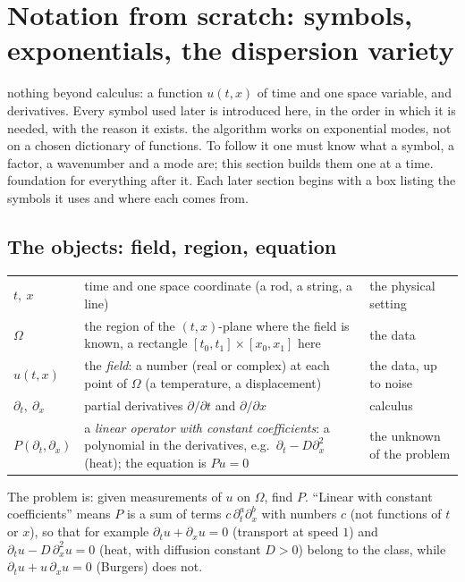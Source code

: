 \section{Notation from scratch: symbols, exponentials, the dispersion variety}\label{sec:prelim}
\sectionbrief
{nothing beyond calculus: a function $u(t,x)$ of time and one space variable, and derivatives. Every symbol used later is introduced here, in the order in which it is needed, with the reason it exists.}
{the algorithm works on exponential modes, not on a chosen dictionary of functions. To follow it one must know what a symbol, a factor, a wavenumber and a mode are; this section builds them one at a time.}
{foundation for everything after it. Each later section begins with a box listing the symbols it uses and where each comes from.}

\subsection{The objects: field, region, equation}
\begin{symbols}
\begin{tabular}{@{}L{2.3cm}L{6.2cm}L{4.5cm}@{}}
$t,\ x$ & time and one space coordinate (a rod, a string, a line) & the physical setting\\
$\Omega$ & the region of the $(t,x)$-plane where the field is known, a rectangle $[t_0,t_1]\times[x_0,x_1]$ here & the data\\
$u(t,x)$ & the \emph{field}: a number (real or complex) at each point of $\Omega$ (a temperature, a displacement) & the data, up to noise\\
$\partial_t,\ \partial_x$ & partial derivatives $\partial/\partial t$ and $\partial/\partial x$ & calculus\\
$P(\partial_t,\partial_x)$ & a \emph{linear operator with constant coefficients}: a polynomial in the derivatives, e.g.\ $\partial_t-D\partial_x^2$ (heat); the equation is $Pu=0$ & the unknown of the problem\\
\end{tabular}
\end{symbols}

The problem is: given measurements of $u$ on $\Omega$, find $P$. ``Linear with constant coefficients'' means $P$ is a sum of terms $c\,\partial_t^a\partial_x^b$ with numbers $c$ (not functions of $t$ or $x$), so that for example $\partial_t u+\partial_xu=0$ (transport at speed $1$) and $\partial_tu-D\,\partial_x^2u=0$ (heat, with diffusion constant $D>0$) belong to the class, while $\partial_tu+u\,\partial_xu=0$ (Burgers) does not.

